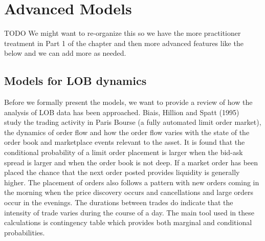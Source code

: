 \section{Advanced Models}

TODO We might want to re-organize this so we have the more practitioner treatment in Part 1 of the chapter and then more advanced features like the below and we can add more as needed.

\subsection{Models for LOB dynamics}

Before we formally present the models, we want to provide a review of how the analysis of LOB data has been approached. Biais, Hillion and Spatt (1995)~\cite{spalt} study the trading activity in Paris Bourse (a fully automated limit order market), the dynamics of order flow and how the order flow varies with the state of the order book and marketplace events relevant to the asset. It is found that the conditional probability of a limit order placement is larger when the bid-ask spread is larger and when the order book is not deep. If a market order has been placed the chance that the next order posted provides liquidity is generally higher. The placement of orders also follows a pattern with new orders coming in the morning when the price discovery occurs and cancellations and large orders occur in the evenings. The durations between trades do indicate that the intensity of trade varies during the course of a day. The main tool used in these calculations is contingency table which provides both marginal and conditional probabilities. \\

